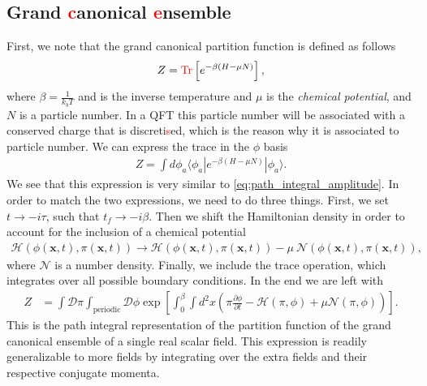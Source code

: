        \subsection{Grand \textcolor{red}{c}anonical \textcolor{red}{e}nsemble} \label{GCE_sec}
        First, we note that the grand canonical partition function is defined as follows
        \begin{align}
            Z= \textcolor{red}{\mathrm{Tr}} \left[e^{-\beta \left( H - \mu N \right)}\right],
        \end{align}
        where $\beta = \frac{1}{k_b T}$ and is the inverse temperature and $\mu$ is the \textit{chemical potential}, and $N$ is a particle number. In a QFT this particle number will be associated with a conserved charge that is discreti\textcolor{red}{s}ed, which is the reason why it is associated to particle number. We can express the trace in the $\phi$ basis
        \begin{align}
            Z= \int d \phi_a \langle \phi_a | e^{-\beta \left( H - \mu N \right)} | \phi_a \rangle.
        \end{align}
        We see that this expression is very similar to \ref{eq:path_integral_amplitude}. In order to match the two expressions, we need to do three things. First, we set $t \rightarrow -i \tau$, such that $t_f \rightarrow -i \beta$. Then we shift the Hamiltonian density in order to account for the inclusion of a chemical potential
        \begin{align}
            \mathcal{H} \left(\phi(\bm{x},t),\pi (\bm{x},t) \right) \rightarrow \mathcal{H}\left(\phi(\bm{x},t),\pi (\bm{x},t) \right) - \mu \ \mathcal{N}\left(\phi(\bm{x},t),\pi (\bm{x},t) \right),
        \end{align}
        where $\mathcal{N}$ is a number density. Finally, we include the trace operation, which integrates over all possible boundary conditions. In the end we are left with
        \begin{align}
            Z &= \int \mathcal{D} \pi \int_{\text{periodic}} \mathcal{D} \phi \exp \left[ \int_0^{\beta} \int d^2x \left(\pi \frac{\partial \phi}{\partial t} - \mathcal{H}(\pi, \phi) + \mu \mathcal{N}(\pi, \phi) \right) \right] \label{eq:partition_function}.
        \end{align}
This is the path integral representation of the partition function of the grand canonical ensemble of a single real scalar field. This expression is readily generalizable to more fields by integrating over the extra fields and their respective conjugate momenta.

